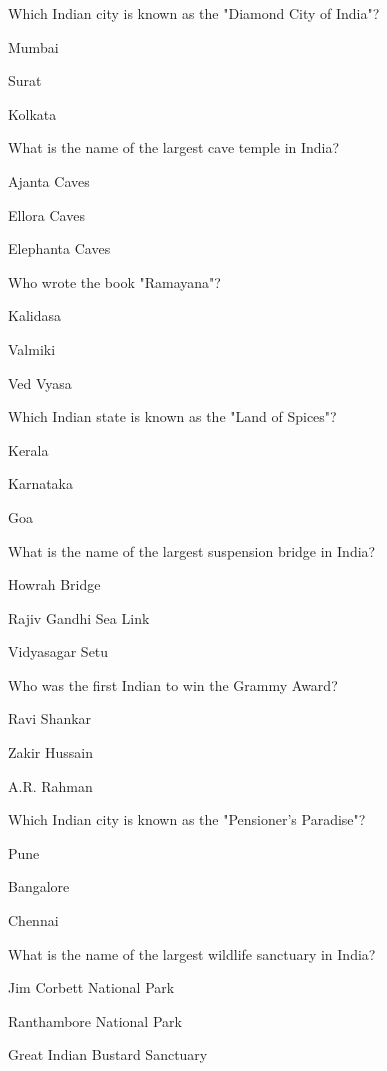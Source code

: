 \begin{enhancedmcq}{Which Indian city is known as the "Diamond City of India"?}
\item Mumbai
\item Surat
\item Kolkata

\end{enhancedmcq}
\begin{enhancedmcq}{What is the name of the largest cave temple in India?}
\item Ajanta Caves
\item Ellora Caves
\item Elephanta Caves

\end{enhancedmcq}
\begin{enhancedmcq}{Who wrote the book "Ramayana"?}
\item Kalidasa
\item Valmiki
\item Ved Vyasa

\end{enhancedmcq}
\begin{enhancedmcq}{Which Indian state is known as the "Land of Spices"?}
\item Kerala
\item Karnataka
\item Goa

\end{enhancedmcq}
\begin{enhancedmcq}{What is the name of the largest suspension bridge in India?}
\item Howrah Bridge
\item Rajiv Gandhi Sea Link
\item Vidyasagar Setu

\end{enhancedmcq}
\begin{enhancedmcq}{Who was the first Indian to win the Grammy Award?}
\item Ravi Shankar
\item Zakir Hussain
\item A.R. Rahman

\end{enhancedmcq}
\begin{enhancedmcq}{Which Indian city is known as the "Pensioner's Paradise"?}
\item Pune
\item Bangalore
\item Chennai

\end{enhancedmcq}
\begin{enhancedmcq}{What is the name of the largest wildlife sanctuary in India?}
\item Jim Corbett National Park
\item Ranthambore National Park
\item Great Indian Bustard Sanctuary
\end{enhancedmcq}